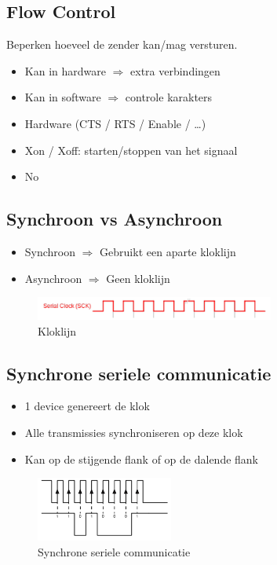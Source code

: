 \documentclass{article}
\begin{document}
\subsection{Flow Control}
Beperken hoeveel de zender kan/mag versturen.

\begin{itemize}
    \item Kan in hardware $\Rightarrow$ extra verbindingen
    \item Kan in software $\Rightarrow$ controle karakters
\end{itemize}

\begin{itemize}
    \item Hardware (CTS / RTS / Enable / \dots)
    \item Xon / Xoff: starten/stoppen van het signaal
    \item No
\end{itemize}

\subsection{Synchroon vs Asynchroon}
\begin{itemize}
    \item Synchroon $\Rightarrow$ Gebruikt een aparte kloklijn
    \item Asynchroon $\Rightarrow$ Geen kloklijn
\end{itemize}

\begin{figure}[H]
    \centering
    \includegraphics[width=0.7\textwidth]{Screenshot_20200323_120525.png}
    \caption{Kloklijn}
\end{figure}

\subsection{Synchrone seriele communicatie}
\begin{itemize}
    \item 1 device genereert de klok
    \item Alle transmissies synchroniseren op deze klok
    \item Kan op de stijgende flank of op de dalende flank 
\end{itemize}

\begin{figure}[H]
    \centering
    \includegraphics[width=0.4\textwidth]{Screenshot_20200323_120955.png}
    \caption{Synchrone seriele communicatie}
\end{figure}
\end{document}
